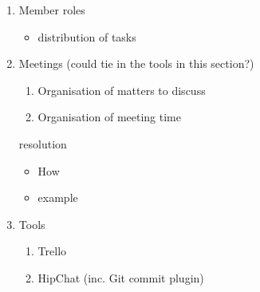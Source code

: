 \begin{enumerate}
	\item Member roles
	\begin{itemize}
		\item distribution of tasks
	\end{itemize}
	\item Meetings (could tie in the tools in this section?)
	\begin{enumerate}
		\item Organisation of matters to discuss
		\item Organisation of meeting time
	\end{enumerate}
	\Conflict resolution
	\begin{itemize}
		\item How
		\item example
	\end{itemize}
	\item Tools
	\begin{enumerate}
		\item Trello
		\item HipChat (inc. Git commit plugin)
	\end{enumerate}
\end{enumerate}
